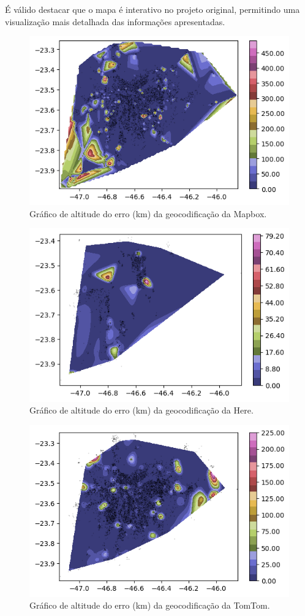 É válido destacar que o mapa é interativo no projeto original, permitindo uma visualização mais detalhada das informações apresentadas.

\begin{figure}[h]
  \centering
  \includegraphics[width=\textwidth]{Figuras/graficoAltPontosMapbox.png}
  \caption{Gráfico de altitude do erro (km) da geocodificação da Mapbox.}
  \label{fig:grafAltM}
\end{figure}

\begin{figure}[h]
  \centering
  \includegraphics[width=\textwidth]{Figuras/graficoAltPontosHere.png}
  \caption{Gráfico de altitude do erro (km) da geocodificação da Here.}
  \label{fig:grafAltH}
\end{figure}

\begin{figure}[h]
  \centering
  \includegraphics[width=\textwidth]{Figuras/graficoAltPontosTomtom.png}
  \caption{Gráfico de altitude do erro (km) da geocodificação da TomTom.}
  \label{fig:grafAltT}
\end{figure}